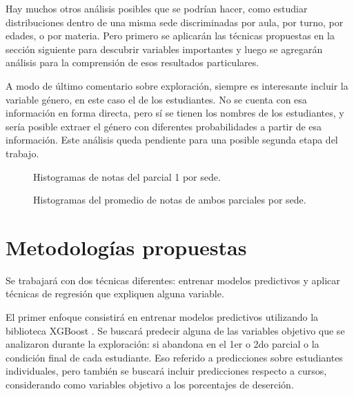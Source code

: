 \documentclass[a4paper,11pt,dvipsnames]{article}
\begin{document}
Hay muchos otros análisis posibles que se podrían hacer, como estudiar distribuciones dentro de una misma sede discriminadas por aula, por turno, por edades, o por materia. Pero primero se aplicarán las técnicas propuestas en la sección siguiente para descubrir variables importantes y luego se agregarán análisis para la comprensión de esos resultados particulares.\par\medskip

A modo de último comentario sobre exploración, siempre es interesante incluir la variable género, en este caso el de los estudiantes. No se cuenta con esa información en forma directa, pero sí se tienen los nombres de los estudiantes, y sería posible extraer el género con diferentes probabilidades a partir de esa información. Este análisis queda pendiente para una posible segunda etapa del trabajo.

\begin{figure}[!t]
    \begin{center}
        
    \end{center}
    \caption{Histogramas de notas del parcial 1 por sede.}
    \label{fig:hist-pa1}
\end{figure}

\begin{figure}[!b]
    \begin{center}
        
    \end{center}
    \caption{Histogramas del promedio de notas de ambos parciales por sede.}
    \label{fig:hist-promedios}
\end{figure}\clearpage


\section{Metodologías propuestas}

Se trabajará con dos técnicas diferentes: entrenar modelos predictivos y aplicar técnicas de regresión que expliquen alguna variable.\par\medskip

El primer enfoque consistirá en entrenar modelos predictivos utilizando la biblioteca XGBoost \cite{Chen:2016:XST:2939672.2939785}. Se buscará predecir alguna de las variables objetivo que se analizaron durante la exploración: si abandona en el 1er o 2do parcial o la condición final de cada estudiante. Eso referido a predicciones sobre estudiantes individuales, pero también se buscará incluir predicciones respecto a cursos, considerando como variables objetivo a los porcentajes de deserción.\par\medskip
\end{document}
